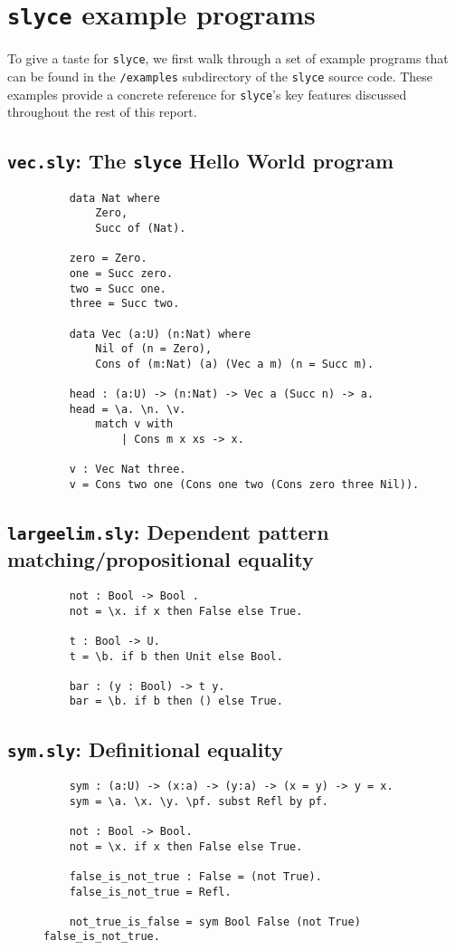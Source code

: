 \section{\texttt{slyce} example programs}
To give a taste for \texttt{slyce}, we first walk through a set of example programs that can be found in the \texttt{/examples} subdirectory of the \texttt{slyce} source code.
These examples provide a concrete reference for \texttt{slyce}'s key features discussed throughout the rest of this report.
\subsection{\texttt{vec.sly}: The \texttt{slyce} Hello World program}
\begin{figure}[h!]
\begin{lstlisting}
    data Nat where
        Zero,
        Succ of (Nat).

    zero = Zero.
    one = Succ zero.
    two = Succ one.
    three = Succ two.

    data Vec (a:U) (n:Nat) where
        Nil of (n = Zero),
        Cons of (m:Nat) (a) (Vec a m) (n = Succ m).

    head : (a:U) -> (n:Nat) -> Vec a (Succ n) -> a.
    head = \a. \n. \v.
        match v with
            | Cons m x xs -> x.

    v : Vec Nat three.
    v = Cons two one (Cons one two (Cons zero three Nil)).
\end{lstlisting}
\end{figure}

\subsection{\texttt{largeelim.sly}: Dependent pattern matching/propositional equality}
\begin{figure}[h!]
\begin{lstlisting}
    not : Bool -> Bool .
    not = \x. if x then False else True.
    
    t : Bool -> U.
    t = \b. if b then Unit else Bool.
    
    bar : (y : Bool) -> t y.
    bar = \b. if b then () else True.    
\end{lstlisting}
\end{figure}
\subsection{\texttt{sym.sly}: Definitional equality}
\begin{figure}[h!]
\begin{lstlisting}
    sym : (a:U) -> (x:a) -> (y:a) -> (x = y) -> y = x.
    sym = \a. \x. \y. \pf. subst Refl by pf.

    not : Bool -> Bool.
    not = \x. if x then False else True.

    false_is_not_true : False = (not True).
    false_is_not_true = Refl.

    not_true_is_false = sym Bool False (not True) false_is_not_true.
\end{lstlisting}
\end{figure}
